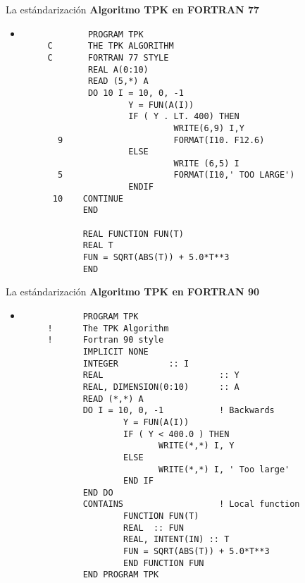\begin{frame}[fragile]{La estándarización}
    \textbf{Algoritmo TPK en FORTRAN 77}
    \begin{itemize}
    \item []   
     \begin{verbatim}
             PROGRAM TPK
     C       THE TPK ALGORITHM
     C       FORTRAN 77 STYLE
             REAL A(0:10)
             READ (5,*) A
             DO 10 I = 10, 0, -1
                     Y = FUN(A(I))
                     IF ( Y . LT. 400) THEN
                              WRITE(6,9) I,Y
       9                      FORMAT(I10. F12.6)
                     ELSE
                              WRITE (6,5) I
       5                      FORMAT(I10,' TOO LARGE')
                     ENDIF
      10    CONTINUE
            END

            REAL FUNCTION FUN(T)
            REAL T
            FUN = SQRT(ABS(T)) + 5.0*T**3
            END
     \end{verbatim}
    \end{itemize}
\end{frame}


\begin{frame}[fragile]{La estándarización}
    \textbf{Algoritmo TPK en FORTRAN 90}
    \begin{itemize}
    \item []  
     \begin{verbatim}
            PROGRAM TPK
     !      The TPK Algorithm
     !      Fortran 90 style
            IMPLICIT NONE
            INTEGER          :: I
            REAL                       :: Y
            REAL, DIMENSION(0:10)      :: A
            READ (*,*) A
            DO I = 10, 0, -1           ! Backwards
                    Y = FUN(A(I))
                    IF ( Y < 400.0 ) THEN
                           WRITE(*,*) I, Y
                    ELSE
                           WRITE(*,*) I, ' Too large'
                    END IF
            END DO
            CONTAINS                   ! Local function
                    FUNCTION FUN(T)
                    REAL  :: FUN
                    REAL, INTENT(IN) :: T
                    FUN = SQRT(ABS(T)) + 5.0*T**3
                    END FUNCTION FUN
            END PROGRAM TPK
     \end{verbatim}
    \end{itemize}
\end{frame}

